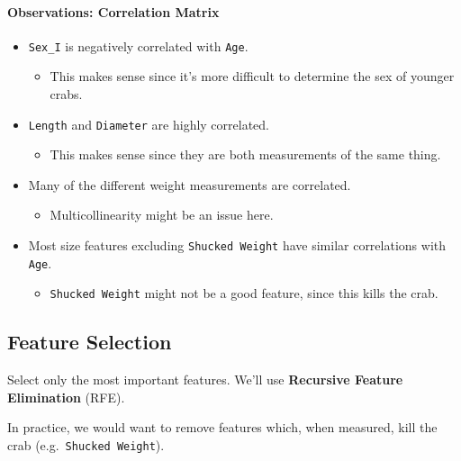 \documentclass[11pt]{article}
\providecommand{\tightlist}{%
      \setlength{\itemsep}{0pt}\setlength{\parskip}{0pt}}
\begin{document}
    \paragraph{Observations: Correlation
Matrix}\label{observations-correlation-matrix}

\begin{itemize}
\tightlist
\item
  \texttt{Sex\_I} is negatively correlated with \texttt{Age}.

  \begin{itemize}
  \tightlist
  \item
    This makes sense since it's more difficult to determine the sex of
    younger crabs.
  \end{itemize}
\item
  \texttt{Length} and \texttt{Diameter} are highly correlated.

  \begin{itemize}
  \tightlist
  \item
    This makes sense since they are both measurements of the same thing.
  \end{itemize}
\item
  Many of the different weight measurements are correlated.

  \begin{itemize}
  \tightlist
  \item
    Multicollinearity might be an issue here.
  \end{itemize}
\item
  Most size features excluding \texttt{Shucked\ Weight} have similar
  correlations with \texttt{Age}.

  \begin{itemize}
  \tightlist
  \item
    \texttt{Shucked\ Weight} might not be a good feature, since this
    kills the crab.
  \end{itemize}
\end{itemize}

    \subsection{Feature Selection}\label{feature-selection}

Select only the most important features. We'll use \textbf{Recursive
Feature Elimination} (RFE).

In practice, we would want to remove features which, when measured, kill
the crab (e.g.~\texttt{Shucked\ Weight}).
\end{document}
